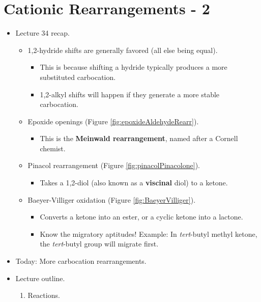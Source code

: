 \documentclass[../notes.tex]{subfiles}
\begin{document}
\section{Cationic Rearrangements - 2}
\begin{itemize}
    \item {}Lecture 34 recap.
    \begin{itemize}
        \item 1,2-hydride shifts are generally favored (all else being equal).
        \begin{itemize}
            \item This is because shifting a hydride typically produces a more substituted carbocation.
            \item 1,2-alkyl shifts will happen if they generate a more stable carbocation.
        \end{itemize}
        \item Epoxide openings (Figure \ref{fig:epoxideAldehydeRearr}).
        \begin{itemize}
            \item This is the \textbf{Meinwald rearrangement}, named after a Cornell chemist.
        \end{itemize}
        \item Pinacol rearrangement (Figure \ref{fig:pinacolPinacolone}).
        \begin{itemize}
            \item Takes a 1,2-diol (also known as a \textbf{viscinal} diol) to a ketone.
        \end{itemize}
        \item Baeyer-Villiger oxidation (Figure \ref{fig:BaeyerVilliger}).
        \begin{itemize}
            \item Converts a ketone into an ester, or a cyclic ketone into a lactone.
            \item Know the migratory aptitudes! Example: In \emph{tert}-butyl methyl ketone, the \emph{tert}-butyl group will migrate first.
        \end{itemize}
    \end{itemize}
    \item Today: More carbocation rearrangements.
    \item Lecture outline.
    \begin{enumerate}[label={\Alph*.},start=3]
        \item Reactions.
        \begin{enumerate}[label={\arabic*)},start=3]

\end{enumerate}
\end{enumerate}
\end{itemize}
\end{document}
